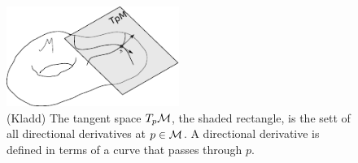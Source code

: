 \begin{figure}[ht]
    \centering
    \includegraphics[width=0.5\textwidth]{figurer/tangent space.pdf} 
    \caption{
        (Kladd) The tangent space $T_p \mathcal{M}$, the shaded rectangle, is the sett of all directional derivatives at $p\in \mathcal{M}$. A directional derivative is defined in terms of a curve that passes through $p$.
        } 
    \label{fig: tangent space}
\end{figure}



